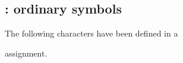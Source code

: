 \documentclass{book}
\begin{document}
\vfil\eject

\def\prevclass{}\def\prevfaml{}

\subsection{ : ordinary symbols}

 The following characters have been defined
in a
\begin{disp}
\end{disp}
assignment.
\par\leavevmode\par
\end{document}
